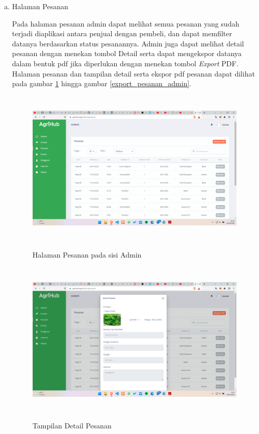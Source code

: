 \begin{enumerate}
\begin{enumerate}[a.]
		\item Halaman Pesanan
		\par Pada halaman pesanan admin dapat melihat semua pesanan yang sudah terjadi diaplikasi antara penjual dengan pembeli, dan dapat memfilter datanya berdasarkan status pesanannya. Admin juga dapat melihat detail pesanan dengan menekan tombol Detail serta dapat mengekspor datanya dalam bentuk pdf jika diperlukan dengan menekan tombol \textit{Export} PDF. Halaman pesanan dan tampilan detail serta ekspor pdf pesanan dapat dilihat pada gambar \ref*{pesanan_admin} hingga gambar \ref*{export_pesanan_admin}.
		\begin{figure}[H]
			\centering
			{\includegraphics [width = 13cm, height= 7.5cm]{gambar/admin/pesanan_admin}}
			\caption{Halaman Pesanan pada sisi Admin}
			\label{pesanan_admin}
		\end{figure}
		\begin{figure}[H]
			\centering
			{\includegraphics [width = 13cm, height= 7.5cm]{gambar/admin/detail_pesanan}}
			\caption{Tampilan Detail Pesanan}
			\label{detail_pesanan}
		\end{figure}

\end{enumerate}
\end{enumerate}
